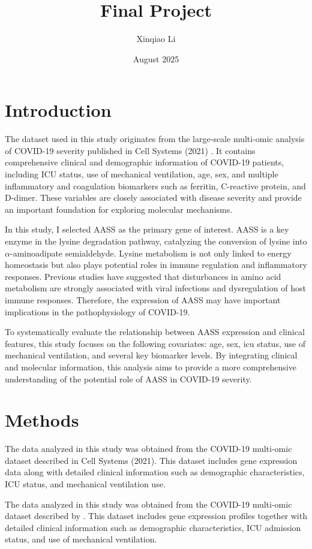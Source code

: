 \documentclass{article}
\title{Final Project}
\author{Xinqiao Li }
\date{August 2025}
\begin{document}
\maketitle


\section{Introduction}
The dataset used in this study originates from the large-scale multi-omic analysis of COVID-19 severity published in Cell Systems (2021) .
 It contains comprehensive clinical and demographic information of COVID-19 patients, including ICU status, use of mechanical ventilation, age, sex, and multiple inflammatory and coagulation biomarkers such as ferritin, C-reactive protein, and D-dimer. These variables are closely associated with disease severity and provide an important foundation for exploring molecular mechanisms.  

In this study, I selected AASS as the primary gene of interest. AASS is a key enzyme in the lysine degradation pathway, catalyzing the conversion of lysine into $\alpha$-aminoadipate semialdehyde. Lysine metabolism is not only linked to energy homeostasis but also plays potential roles in immune regulation and inflammatory responses. Previous studies have suggested that disturbances in amino acid metabolism are strongly associated with viral infections and dysregulation of host immune responses. Therefore, the expression of AASS may have important implications in the pathophysiology of COVID-19.  

To systematically evaluate the relationship between AASS expression and clinical features, this study focuses on the following covariates: age, sex, icu status, use of mechanical ventilation, and several key biomarker levels. By integrating clinical and molecular information, this analysis aims to provide a more comprehensive understanding of the potential role of AASS in COVID-19 severity.  




\section{Methods}
The data analyzed in this study was obtained from the COVID-19 multi-omic dataset described in Cell Systems (2021). This dataset includes gene expression data along with detailed clinical information such as demographic characteristics, ICU status, and mechanical ventilation use.  


The data analyzed in this study was obtained from the COVID-19 multi-omic dataset described by  \cite{overmyer_large-scale_2021}. This dataset includes gene expression profiles together with detailed clinical information such as demographic characteristics, ICU admission status, and use of mechanical ventilation.  
\end{document}
